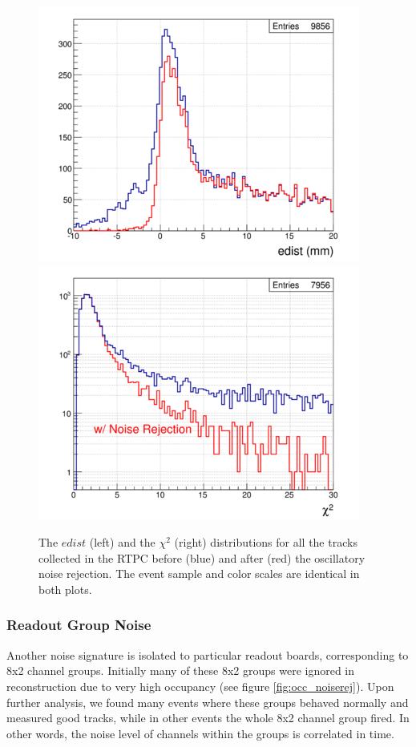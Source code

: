 \begin{figure}[tbp]
\includegraphics[scale=0.55]{fig_rtpc/400px-Edist_noiserej.png}
\includegraphics[scale=0.55]{fig_rtpc/400px-X2_noiserej.png}
\caption{The $edist$ (left) and the $\chi^{2}$ (right) distributions for all the tracks collected in the RTPC before (blue) and after (red) the oscillatory noise rejection. The event sample and color scales are identical in both plots.}
\label{fig:noise_edist_}
\end{figure}

\subsubsection{Readout Group Noise}
Another noise signature is isolated to particular readout boards, corresponding 
to 8x2 channel groups. Initially many of these 8x2 groups were ignored in 
reconstruction due to very high occupancy (see figure \ref{fig:occ_noiserej}).  
Upon further analysis, we found many events where these groups behaved normally 
and measured good tracks, while in other events the whole 8x2 channel group 
fired. In other words, the noise level of channels within the groups is 
correlated in time.

